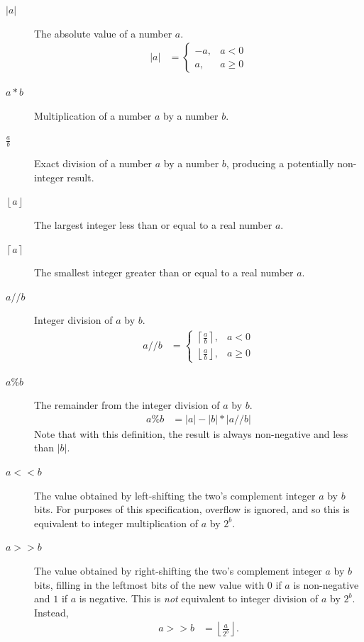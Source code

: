 \documentclass[11pt,letterpaper]{book}
\numberwithin{equation}{chapter}
\numberwithin{figure}{chapter}
\numberwithin{table}{chapter}
\begin{document}
\begin{description}
\item[$|a|$]
The absolute value of a number $a$.
\begin{align*}
|a| & = \left\{\begin{array}{ll}
-a, & a < 0 \\
a, & a \ge 0
\end{array}\right.
\end{align*}

\item[$a*b$]
Multiplication of a number $a$ by a number $b$.
\item[$\frac{a}{b}$]
Exact division of a number $a$ by a number $b$, producing a potentially
 non-integer result.

\item[$\left\lfloor a\right\rfloor$] 
The largest integer less than or equal to a real number $a$.

\item[$\left\lceil a\right\rceil$]
The smallest integer greater than or equal to a real number $a$.

\item[$a//b$]
Integer division of $a$ by $b$.
\begin{align*}
a//b & = \left\{\begin{array}{ll}
\left\lceil\frac{a}{b}\right\rceil, & a < 0 \\
\left\lfloor\frac{a}{b}\right\rfloor, & a \ge 0
\end{array}\right.
\end{align*}

\item[$a\%b$]
The remainder from the integer division of $a$ by $b$.
\begin{align*}
a\%b & = |a|-|b|*|a//b|
\end{align*}
Note that with this definition, the result is always non-negative and less than
 $|b|$.

\item[$a<<b$]
The value obtained by left-shifting the two's complement integer $a$ by $b$
 bits.
For purposes of this specification, overflow is ignored, and so this is
 equivalent to integer multiplication of $a$ by $2^b$.

\item[$a>>b$]
The value obtained by right-shifting the two's complement integer $a$ by $b$
 bits, filling in the leftmost bits of the new value with $0$ if $a$ is
 non-negative and $1$ if $a$ is negative.
This is {\em not} equivalent to integer division of $a$ by $2^b$.
Instead,
\begin{align*}
a>>b & = \left\lfloor\frac{a}{2^b}\right\rfloor.
\end{align*}


\end{description}
\end{document}
